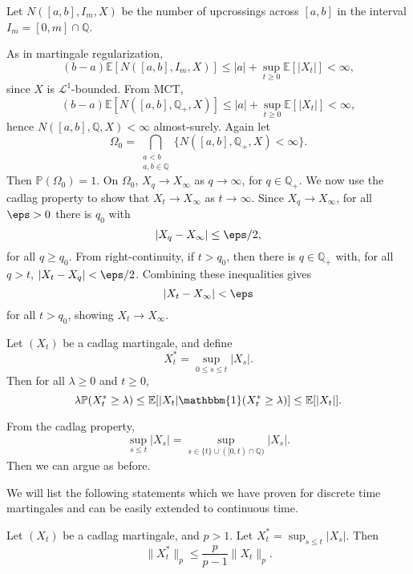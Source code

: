 \documentclass[12pt]{article}
\begin{document}
\begin{proofbox}
	Let $N([a, b], I_m, X)$ be the number of upcrossings across $[a, b]$ in the interval $I_m = [0, m] \cap \mathbb{Q}$.

	As in martingale regularization,
	\[
		(b - a) \mathbb{E}[N([a, b], I_m, X)] \leq |a| + \sup_{t \geq 0} \mathbb{E}[|X_t|] < \infty,
	\]
	since $X$ is $\mathcal{L}^1$-bounded. From MCT,
	\[
		(b - a) \mathbb{E}[N([a, b], \mathbb{Q}_+, X)] \leq |a| + \sup_{t \geq 0} \mathbb{E}[|X_t|] < \infty,
	\]
	hence $N([a, b], \mathbb{Q}, X) < \infty$ almost-surely. Again let
	\[
		\Omega_0 = \bigcap_{\substack{a < b \\ a, b\in \mathbb{Q}}} \{N([a, b], \mathbb{Q}_+, X) < \infty\}.
	\]
	Then $\mathbb{P}(\Omega_0) = 1$. On $\Omega_0$, $X_q \to X_\infty$ as $q \to \infty$, for $q \in \mathbb{Q}_+$. We now use the cadlag property to show that $X_t \to X_\infty$ as $t \to \infty$. Since $X_q \to X_\infty$, for all $\eps > 0$ there is $q_0$ with
	\[
	|X_q - X_\infty| \leq \eps/2,
	\]
	for all $q \geq q_0$. From right-continuity, if $t > q_0$, then there is $q \in \mathbb{Q}_+$ with, for all $q > t$, $|X_t - X_q| < \eps / 2$. Combining these inequalities gives
	\[
	|X_t - X_\infty| < \eps
	\]
	for all $t > q_0$, showing $X_t \to X_\infty$.
\end{proofbox}

\begin{theorem}
	Let $(X_t)$ be a cadlag martingale, and define
	\[
	X_t^{\ast} = \sup_{0 \leq s \leq t} |X_s|.
	\]
	Then for all $\lambda \geq 0$ and $t \geq 0$,
	\[
	\lambda \mathbb{P}(X_t^{\ast} \geq \lambda) \leq \mathbb{E}[|X_t| \mathbbm{1}(X_t^{\ast} \geq \lambda)] \leq \mathbb{E}[|X_t|].
	\]
\end{theorem}

\begin{proofbox}
	From the cadlag property,
	\[
		\sup_{s \leq t} |X_s| = \sup_{s \in \{t\} \cup([0, t) \cap \mathbb{Q})} |X_s|.
	\]
	Then we can argue as before.
\end{proofbox}

We will list the following statements which we have proven for discrete time martingales and can be easily extended to continuous time.

\begin{theorem}Let $(X_t)$ be a cadlag martingale, and $p > 1$. Let $X_t^{\ast} = \sup_{s \leq t} |X_s|$. Then
	\[
	\|X_t^{\ast}\|_p \leq \frac{p}{p-1} \|X_t\|_p.
	\]
\end{theorem}
\end{document}
